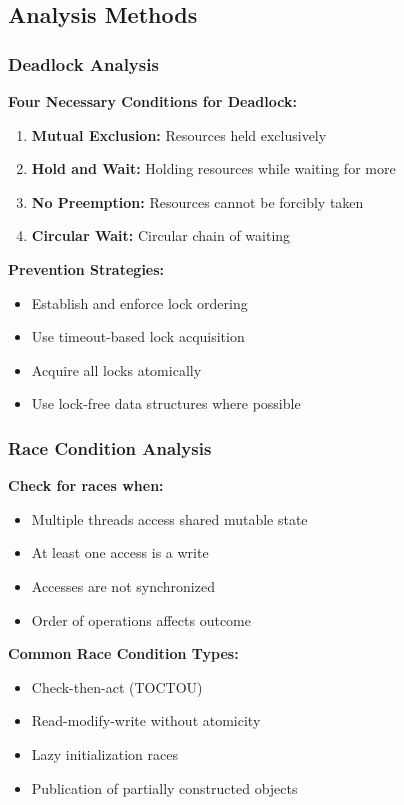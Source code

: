 \documentclass[11pt,letterpaper]{article}
\begin{document}
\subsection{Analysis Methods}

\subsubsection{Deadlock Analysis}

\begin{hazardbox}
\textbf{Four Necessary Conditions for Deadlock:}
\begin{enumerate}[nosep]
    \item \textbf{Mutual Exclusion:} Resources held exclusively
    \item \textbf{Hold and Wait:} Holding resources while waiting for more
    \item \textbf{No Preemption:} Resources cannot be forcibly taken
    \item \textbf{Circular Wait:} Circular chain of waiting
\end{enumerate}

\textbf{Prevention Strategies:}
\begin{itemize}[nosep]
    \item Establish and enforce lock ordering
    \item Use timeout-based lock acquisition
    \item Acquire all locks atomically
    \item Use lock-free data structures where possible
\end{itemize}
\end{hazardbox}

\subsubsection{Race Condition Analysis}

\begin{hazardbox}
\textbf{Check for races when:}
\begin{itemize}[nosep]
    \item Multiple threads access shared mutable state
    \item At least one access is a write
    \item Accesses are not synchronized
    \item Order of operations affects outcome
\end{itemize}

\textbf{Common Race Condition Types:}
\begin{itemize}[nosep]
    \item Check-then-act (TOCTOU)
    \item Read-modify-write without atomicity
    \item Lazy initialization races
    \item Publication of partially constructed objects
\end{itemize}
\end{hazardbox}
\end{document}
